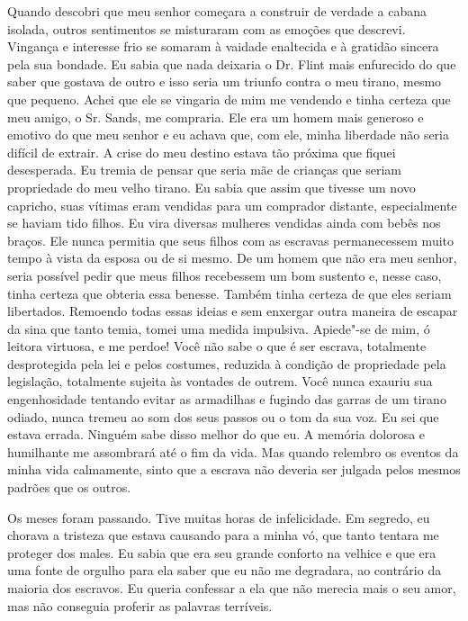 Quando descobri que meu senhor começara
a construir de verdade a cabana isolada, outros sentimentos se
misturaram com as emoções que descrevi. Vingança e interesse frio se
somaram à vaidade enaltecida e à gratidão sincera pela sua bondade. Eu
sabia que nada deixaria o Dr. Flint mais enfurecido do que saber que
gostava de outro e isso seria um triunfo contra o meu tirano, mesmo que
pequeno. Achei que ele se vingaria de mim me vendendo e tinha certeza
que meu amigo, o Sr. Sands, me compraria. Ele era um homem mais generoso
e emotivo do que meu senhor e eu achava que, com ele, minha liberdade
não seria difícil de extrair. A crise do meu destino estava tão próxima
que fiquei desesperada. Eu tremia de pensar que seria mãe de crianças
que seriam propriedade do meu velho tirano. Eu sabia que assim que
tivesse um novo capricho, suas vítimas eram vendidas para um comprador
distante, especialmente se haviam tido filhos. Eu vira diversas mulheres
vendidas ainda com bebês nos braços. Ele nunca permitia que seus filhos
com as escravas permanecessem muito tempo à vista da esposa ou de si
mesmo. De um homem que não era meu senhor, seria possível pedir que meus
filhos recebessem um bom sustento e, nesse caso, tinha certeza que
obteria essa benesse. Também tinha certeza de que eles seriam
libertados. Remoendo todas essas ideias e sem enxergar outra maneira de
escapar da sina que tanto temia, tomei uma medida impulsiva. Apiede"-se
de mim, ó leitora virtuosa, e me perdoe! Você não sabe o que é ser
escrava, totalmente desprotegida pela lei e pelos costumes, reduzida à
condição de propriedade pela legislação, totalmente sujeita às vontades
de outrem. Você nunca exauriu sua engenhosidade tentando evitar as
armadilhas e fugindo das garras de um tirano odiado, nunca tremeu ao som
dos seus passos ou o tom da sua voz. Eu sei que estava errada. Ninguém
sabe disso melhor do que eu. A memória dolorosa e humilhante me
assombrará até o fim da vida. Mas quando relembro os eventos da minha
vida calmamente, sinto que a escrava não deveria ser julgada pelos
mesmos padrões que os outros.

Os meses foram passando. Tive muitas
horas de infelicidade. Em segredo, eu chorava a tristeza que estava
causando para a minha vó, que tanto tentara me proteger dos males. Eu
sabia que era seu grande conforto na velhice e que era uma fonte de
orgulho para ela saber que eu não me degradara, ao contrário da maioria
dos escravos. Eu queria confessar a ela que não merecia mais o seu amor,
mas não conseguia proferir as palavras terríveis.

